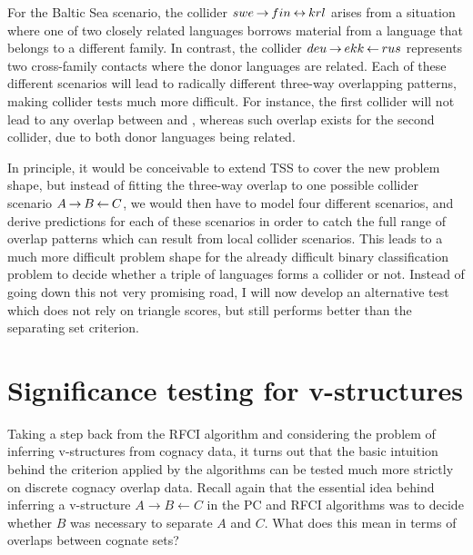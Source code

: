 For the Baltic Sea scenario, the collider $swe \kern 2pt\hbox{$\rightarrow$}\kern 2pt fin \kern 2pt\hbox{$\leftrightarrow$}\kern 2pt krl$ arises from a situation where one of two closely related languages borrows material from a language that belongs to a different family. In contrast, the collider $deu \kern 2pt\hbox{$\rightarrow$}\kern 2pt ekk \kern 2pt\hbox{$\leftarrow$}\kern 2pt rus$ represents two cross-family contacts where the donor languages are related. Each of these different scenarios will lead to radically different three-way overlapping patterns, making collider tests much more difficult. For instance, the first collider will not lead to any overlap between  and , whereas such overlap exists for the second collider, due to both donor languages being related.

In principle, it would be conceivable to extend TSS to cover the new problem shape, but instead of fitting the three-way overlap to one possible collider scenario $A \kern 2pt\hbox{$\rightarrow$}\kern 2pt B \kern 2pt\hbox{$\leftarrow$}\kern 2pt C$, we would then have to model four different scenarios, and derive predictions for each of these scenarios in order to catch the full range of overlap patterns which can result from local collider scenarios. This leads to a much more difficult problem shape for the already difficult binary classification problem to decide whether a triple of languages forms a collider or not. Instead of going down this not very promising road, I will now develop an alternative test which does not rely on triangle scores, but still performs better than the separating set criterion.
 
\section{Significance testing for v-structures}
Taking a step back from the RFCI algorithm and considering the problem of inferring v-structures from cognacy data, it turns out that the basic intuition behind the criterion applied by the algorithms can be tested much more strictly on discrete cognacy overlap data. Recall again that the essential idea behind inferring a v-structure $A \rightarrow B \leftarrow C$ in the PC and RFCI algorithms was to decide whether $B$ was necessary to separate $A$ and $C$. What does this mean in terms of overlaps between cognate sets?


